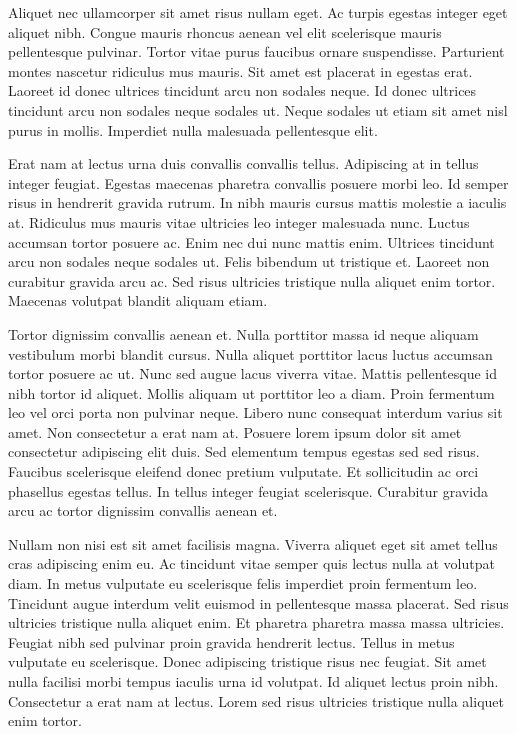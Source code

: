 \documentclass[11pt,a4paper]{article}
\begin{document}
Aliquet nec ullamcorper sit amet risus nullam eget. Ac turpis egestas integer eget aliquet nibh. Congue mauris rhoncus aenean vel elit scelerisque mauris pellentesque pulvinar. Tortor vitae purus faucibus ornare suspendisse. Parturient montes nascetur ridiculus mus mauris. Sit amet est placerat in egestas erat. Laoreet id donec ultrices tincidunt arcu non sodales neque. Id donec ultrices tincidunt arcu non sodales neque sodales ut. Neque sodales ut etiam sit amet nisl purus in mollis. Imperdiet nulla malesuada pellentesque elit.

Erat nam at lectus urna duis convallis convallis tellus. Adipiscing at in tellus integer feugiat. Egestas maecenas pharetra convallis posuere morbi leo. Id semper risus in hendrerit gravida rutrum. In nibh mauris cursus mattis molestie a iaculis at. Ridiculus mus mauris vitae ultricies leo integer malesuada nunc. Luctus accumsan tortor posuere ac. Enim nec dui nunc mattis enim. Ultrices tincidunt arcu non sodales neque sodales ut. Felis bibendum ut tristique et. Laoreet non curabitur gravida arcu ac. Sed risus ultricies tristique nulla aliquet enim tortor. Maecenas volutpat blandit aliquam etiam.

Tortor dignissim convallis aenean et. Nulla porttitor massa id neque aliquam vestibulum morbi blandit cursus. Nulla aliquet porttitor lacus luctus accumsan tortor posuere ac ut. Nunc sed augue lacus viverra vitae. Mattis pellentesque id nibh tortor id aliquet. Mollis aliquam ut porttitor leo a diam. Proin fermentum leo vel orci porta non pulvinar neque. Libero nunc consequat interdum varius sit amet. Non consectetur a erat nam at. Posuere lorem ipsum dolor sit amet consectetur adipiscing elit duis. Sed elementum tempus egestas sed sed risus. Faucibus scelerisque eleifend donec pretium vulputate. Et sollicitudin ac orci phasellus egestas tellus. In tellus integer feugiat scelerisque. Curabitur gravida arcu ac tortor dignissim convallis aenean et.

Nullam non nisi est sit amet facilisis magna. Viverra aliquet eget sit amet tellus cras adipiscing enim eu. Ac tincidunt vitae semper quis lectus nulla at volutpat diam. In metus vulputate eu scelerisque felis imperdiet proin fermentum leo. Tincidunt augue interdum velit euismod in pellentesque massa placerat. Sed risus ultricies tristique nulla aliquet enim. Et pharetra pharetra massa massa ultricies. Feugiat nibh sed pulvinar proin gravida hendrerit lectus. Tellus in metus vulputate eu scelerisque. Donec adipiscing tristique risus nec feugiat. Sit amet nulla facilisi morbi tempus iaculis urna id volutpat. Id aliquet lectus proin nibh. Consectetur a erat nam at lectus. Lorem sed risus ultricies tristique nulla aliquet enim tortor.
\end{document}
